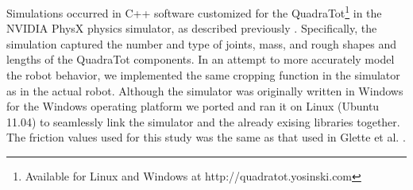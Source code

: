 Simulations occurred in C++ software customized for the QuadraTot\footnote{Available for Linux and Windows at http://quadratot.yosinski.com} in the NVIDIA PhysX physics simulator, as described previously \cite{glette}. 
Specifically, the simulation captured the number and type of joints, mass, and rough shapes and lengths of the QuadraTot components. 
In an attempt to more accurately model the robot behavior, we implemented the same cropping function in the simulator as in the actual robot. %
Although the simulator was originally written in Windows for the Windows operating platform we ported and ran it on Linux (Ubuntu 11.04) to seamlessly link the simulator and the already exising libraries together. 
The friction values used for this study was the same as that used in Glette et al. \cite{glette}. 
%
%


